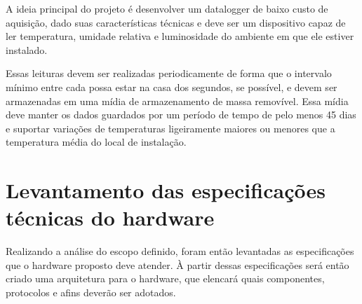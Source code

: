 
A ideia principal do projeto é desenvolver um datalogger de baixo custo de aquisição, dado suas características técnicas e deve ser um dispositivo capaz de ler temperatura, umidade relativa e luminosidade do ambiente em que ele estiver instalado. 

Essas leituras devem ser realizadas periodicamente de forma que o intervalo mínimo entre cada possa estar na casa dos segundos, se possível, e devem ser armazenadas em uma mídia de armazenamento de massa removível. Essa mídia deve manter os dados guardados por um período de tempo  de pelo menos 45 dias e suportar variações de temperaturas ligeiramente maiores ou menores que a temperatura média do local de instalação.

\section{Levantamento das especificações técnicas do hardware}

Realizando a análise do escopo definido, foram então levantadas as especificações que o hardware proposto deve atender. À partir dessas especificações será então criado uma arquitetura para o hardware, que elencará quais componentes, protocolos e afins deverão ser adotados.

